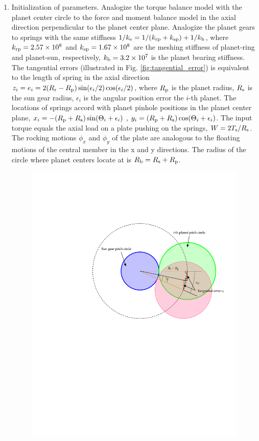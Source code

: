 \documentclass[a4paper,fleqn]{cas-sc}%
\begin{document}
\begin{enumerate}
    \item Initialization of parameters. Analogize the torque balance model with the planet center circle to the force and moment balance model in the axial direction perpendicular to the planet center plane.  Analogize the planet gears to springs with the same stiffness $1/k_{\rm e}=1/(k_{\rm rp}+k_{\rm sp})+1/k_{\rm b}$, where $k_{\rm rp}=2.57\times 10^8$ and $k_{\rm sp}=1.67\times 10^8$ are the meshing stiffness of planet-ring and planet-sun, respectively, $k_{\rm b}=3.2\times 10^7$ is the planet bearing stiffness. The tangential errors (illustrated in Fig. \ref{fig:tangential_error}) is equivalent to the length of spring in the axial direction $z_i=e_i=2(R_{\rm r}-R_{\rm p})\sin(\epsilon_i/2)\cos(\epsilon_i/2)$, where $R_{\rm p}$ is the planet radius, $R_{\rm s}$ is the sun gear radius, $\epsilon_{i}$ is the angular position error the $i$-th planet. The locations of springs accord with planet pinhole positions in the planet center plane, $x_i=-(R_{\rm p}+R_{\rm s})\sin(\Theta_i+\epsilon_i)$ , $y_i=(R_{\rm p}+R_{\rm s})\cos(\Theta_i+\epsilon_i)$. The input torque equals the axial load on a plate pushing on the springs, $W=2T_{\rm s}/R_{\rm s}$.  The rocking motions $\phi_x$ and $\phi_y$ of the plate are analogous to the floating motions of the central member in the x and y directions. The radius of the circle where planet centers locate at is $R_{\rm b}=R_{\rm s}+R_{\rm p}$.
    \begin{figure}[pos=htbp]
        \centering
        \includegraphics[scale=0.5]{tangential_error}

\end{figure}
\end{enumerate}
\end{document}
